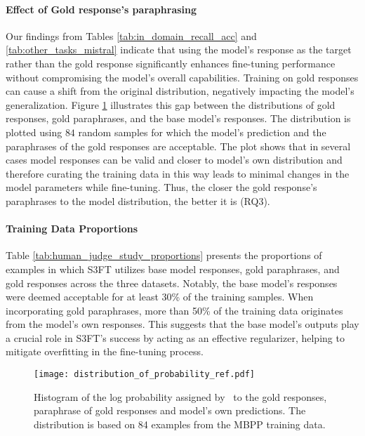 \paragraph{Effect of Gold response's paraphrasing}
Our findings from Tables \ref{tab:in_domain_recall_acc} and \ref{tab:other_tasks_mistral} indicate that using the model's response as the target rather than the gold response significantly enhances fine-tuning performance without compromising the model's overall capabilities. Training on gold responses can cause a shift from the original distribution, negatively impacting the model's generalization. Figure \ref{fig:log_prob_dist} illustrates this gap between the distributions of gold responses, gold paraphrases, and the base model's responses. The distribution is plotted using $84$ random samples for which the model's prediction and the paraphrases of the gold responses are acceptable. The plot shows that in several cases model responses can be valid and closer to model's own distribution and therefore curating the training data in this way leads to minimal changes in the model parameters while fine-tuning. Thus, the closer the gold response's paraphrases to the model distribution, the better it is (RQ3). 

\paragraph{Training Data Proportions}
Table \ref{tab:human_judge_study_proportions} presents the proportions of examples in which S3FT utilizes base model responses, gold paraphrases, and gold responses across the three datasets. Notably, the base model's responses were deemed acceptable for at least 30\% of the training samples. When incorporating gold paraphrases, more than 50\% of the training data originates from the model's own responses. This suggests that the base model's outputs play a crucial role in S3FT's success by acting as an effective regularizer, helping to mitigate overfitting in the fine-tuning process.

\begin{figure}
    \centering
    \texttt{[image: distribution\_of\_probability\_ref.pdf]}
    \caption{Histogram of the log probability assigned by \mistral\ to the gold responses, paraphrase of gold responses and model's own predictions. The distribution is based on 84 examples from the MBPP training data.}
    \label{fig:log_prob_dist}
    \vspace{-1em}
\end{figure}
